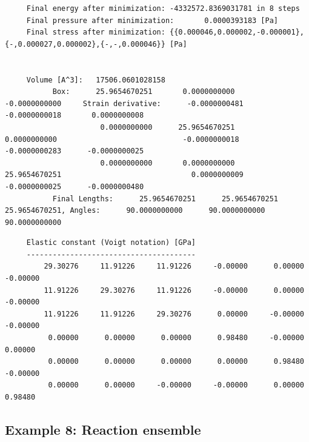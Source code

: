 \begin{tiny}
\begin{verbatim}
     Final energy after minimization: -4332572.8369031781 in 8 steps
     Final pressure after minimization:       0.0000393183 [Pa]
     Final stress after minimization: {{0.000046,0.000002,-0.000001},{-,0.000027,0.000002},{-,-,0.000046}} [Pa]
     
     
     Volume [A^3]:   17506.0601028158
           Box:      25.9654670251       0.0000000000      -0.0000000000     Strain derivative:      -0.0000000481      -0.0000000018       0.0000000008
                      0.0000000000      25.9654670251       0.0000000000                             -0.0000000018      -0.0000000283      -0.0000000025
                      0.0000000000       0.0000000000      25.9654670251                              0.0000000009      -0.0000000025      -0.0000000480
           Final Lengths:      25.9654670251      25.9654670251      25.9654670251, Angles:      90.0000000000      90.0000000000      90.0000000000
\end{verbatim}
\end{tiny}

\begin{tiny}
\begin{verbatim}
     Elastic constant (Voigt notation) [GPa]
     ---------------------------------------
         29.30276     11.91226     11.91226     -0.00000      0.00000     -0.00000
         11.91226     29.30276     11.91226     -0.00000      0.00000     -0.00000
         11.91226     11.91226     29.30276      0.00000     -0.00000     -0.00000
          0.00000      0.00000      0.00000      0.98480     -0.00000      0.00000
          0.00000      0.00000      0.00000      0.00000      0.98480     -0.00000
          0.00000      0.00000     -0.00000     -0.00000      0.00000      0.98480
\end{verbatim}
\end{tiny}

\subsection*{Example 8: Reaction ensemble}

